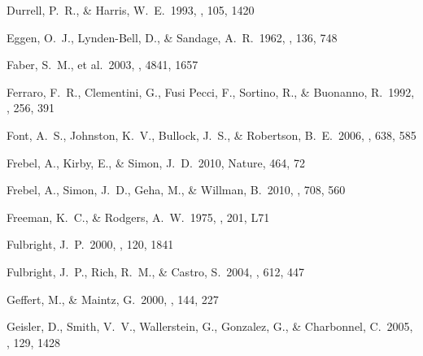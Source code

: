 \documentclass{emulateapj}
\begin{document}
\begin{thebibliography}{}
 Durrell, P.~R., \& Harris,
  W.~E.\ 1993, \aj, 105, 1420

 Eggen, O.~J.,
  Lynden-Bell, D., \& Sandage, A.~R.\ 1962, \apj, 136, 748

 Faber, S.~M., et al.\ 2003,
  \procspie, 4841, 1657


 Ferraro, F.~R., Clementini, G.,
  Fusi Pecci, F., Sortino, R., \& Buonanno, R.\ 1992, \mnras, 256, 391

 Font, A.~S., Johnston, K.~V.,
  Bullock, J.~S., \& Robertson, B.~E.\ 2006, \apj, 638, 585



 Frebel,
  A., Kirby, E., \& Simon, J.~D.\ 2010, Nature, 464, 72

 Frebel, A., Simon, J.~D., Geha,
  M., \& Willman, B.\ 2010, \apj, 708, 560

 Freeman, K.~C., \& Rodgers,
  A.~W.\ 1975, \apjl, 201, L71


 Fulbright, J.~P.\ 2000, \aj, 120,
  1841

 Fulbright, J.~P., Rich, R.~M.,
  \& Castro, S.\ 2004, \apj, 612, 447

 Geffert, M., \& Maintz,
  G.\ 2000, \aaps, 144, 227

 Geisler, D., Smith, V.~V.,
  Wallerstein, G., Gonzalez, G., \& Charbonnel, C.\ 2005, \aj, 129,
  1428



\end{thebibliography}
\end{document}
